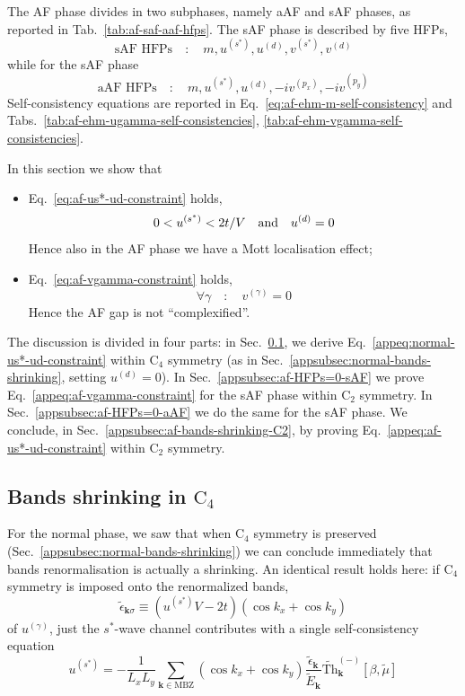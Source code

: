 The AF phase divides in two subphases, namely aAF and sAF phases, as reported in Tab.~\ref{tab:af-saf-aaf-hfps}. The sAF phase is described by five HFPs,
\[
	\text{sAF HFPs}
	\quad\colon\quad
	m, u^{(s^*)}, u^{(d)}, v^{(s^*)}, v^{(d)}
\]
while for the sAF phase
\[
	\text{aAF HFPs}
	\quad\colon\quad
	m, u^{(s^*)}, u^{(d)}, -iv^{(p_x)}, -iv^{(p_y)}
\]
Self-consistency equations are reported in Eq.~\eqref{eq:af-ehm-m-self-consistency} and Tabs.~\ref{tab:af-ehm-ugamma-self-consistencies}, \ref{tab:af-ehm-vgamma-self-consistencies}. 

In this section we show that
\begin{itemize}
	\item Eq.~\eqref{eq:af-us*-ud-constraint} holds,
	\begin{equation}\label{appeq:af-us*-ud-constraint}
		0 < u^{(s^*)} < 2t/V
		\qq{and}
		u^{(d)} = 0
	\end{equation}
	Hence also in the AF phase we have a Mott localisation effect;
	\item Eq.~\eqref{eq:af-vgamma-constraint} holds,
	\begin{equation}\label{appeq:af-vgamma-constraint}
		\forall \gamma
		\quad\colon\quad
		v^{(\gamma)}=0
	\end{equation}
	Hence the AF gap is not ``complexified''.
\end{itemize} 
The discussion is divided in four parts: in Sec.~\ref{appsubsec:af-bands-shrinking}, we derive Eq.~\eqref{appeq:normal-us*-ud-constraint} within $\mathrm{C}_4$ symmetry (as in Sec.~\ref{appsubsec:normal-bands-shrinking}, setting $u^{(d)} = 0$). In Sec.~\ref{appsubsec:af-HFPs=0-sAF} we prove Eq.~\eqref{appeq:af-vgamma-constraint} for the sAF phase within $\mathrm{C}_2$ symmetry. In Sec.~\ref{appsubsec:af-HFPs=0-aAF} we do the same for the sAF phase. We conclude, in Sec.~\ref{appsubsec:af-bands-shrinking-C2}, by proving Eq.~\eqref{appeq:af-us*-ud-constraint} within $\mathrm{C}_2$ symmetry.

\subsection{Bands shrinking in $\mathrm{C}_4$}\label{appsubsec:af-bands-shrinking}

For the normal phase, we saw that when $\mathrm{C}_4$ symmetry is preserved (Sec.~\ref{appsubsec:normal-bands-shrinking}) we can conclude immediately that bands renormalisation is actually a shrinking. An identical result holds here: if $\mathrm{C}_4$ symmetry is imposed onto the renormalized bands,
\[
\tilde{\epsilon}_{\mathbf{k}\sigma} \equiv (u^{(s^*)} V - 2t) (\cos k_x + \cos k_y)
\]
of $u^{(\gamma)}$, just the $s^*$-wave channel contributes with a single self-consistency equation
\[
u^{(s^*)} = - \frac{1}{L_x L_y} \sum_{\mathbf{k}\in\mathrm{MBZ}} (\cos k_x + \cos k_y) \frac{\tilde{\epsilon}_\mathbf{k}}{\tilde{E}_\mathbf{k}} \tilde{\mathrm{Th}}_\mathbf{k}^{(-)}[\beta,\tilde{\mu}]
\]

